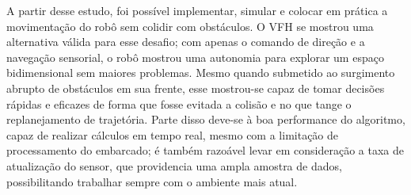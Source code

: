 A partir desse estudo, foi possível implementar, simular e colocar em prática a movimentação do robô sem colidir com obstáculos. O VFH se mostrou uma alternativa válida para esse desafio; com apenas o comando de direção e a navegação sensorial, o robô mostrou uma autonomia para explorar um espaço bidimensional sem maiores problemas. Mesmo quando submetido ao surgimento abrupto de obstáculos em sua frente, esse mostrou-se capaz de tomar decisões rápidas e eficazes de forma que fosse evitada a colisão e no que tange o replanejamento de trajetória. Parte disso deve-se à boa performance do algoritmo, capaz de realizar cálculos em tempo real, mesmo com a limitação de processamento do embarcado; é também razoável levar em consideração a taxa de atualização do sensor, que providencia uma ampla amostra de dados, possibilitando trabalhar sempre com o ambiente mais atual.
